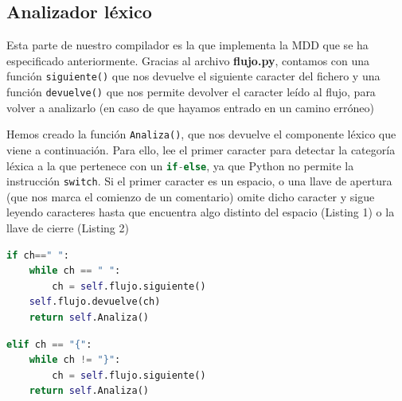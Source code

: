 \documentclass[11pt]{article}
\begin{document}
\subsection{Analizador léxico}
Esta parte de nuestro compilador es la que implementa la MDD que se ha especificado anteriormente. Gracias al archivo \textbf{flujo.py}, contamos con una función \lstinline[language=Python]{siguiente()} que nos devuelve el siguiente caracter del fichero y una función \lstinline[language=Python]{devuelve()} que nos permite devolver el caracter leído al flujo, para volver a analizarlo (en caso de que hayamos entrado en un camino erróneo)

Hemos creado la función \lstinline[language=Python]{Analiza()}, que nos devuelve el componente léxico que viene a continuación. Para ello, lee el primer caracter para detectar la categoría léxica a la que pertenece con un \lstinline[language=Python]{if-else}, ya que Python no permite la instrucción \lstinline[language=Python]{switch}. Si el primer caracter es un espacio, o una llave de apertura (que nos marca el comienzo de un comentario) omite dicho caracter y sigue leyendo caracteres hasta que encuentra algo distinto del espacio (Listing 1) o la llave de cierre (Listing 2)


\newpage
\begin{lstlisting}[language=Python, caption=Omisión de espacios]
	if ch==" ":
    while ch == " ":
    	ch = self.flujo.siguiente()
    self.flujo.devuelve(ch)
    return self.Analiza()
\end{lstlisting}

\begin{lstlisting}[language=Python, caption=Python example]
	elif ch == "{":
    while ch != "}":
    	ch = self.flujo.siguiente()
    return self.Analiza()
\end{lstlisting}
\end{document}
